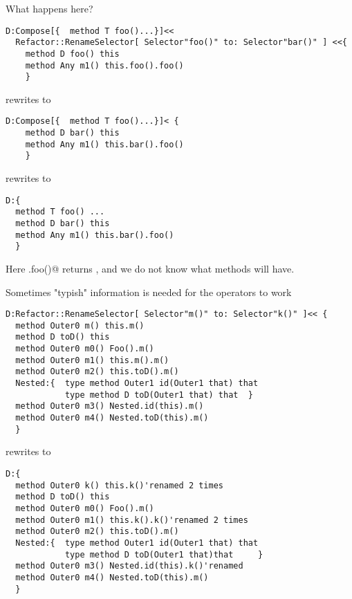 \begin{frame}[fragile]
What happens here?
\begin{NiceCode}{59ex}{0.8}
\begin{lstlisting}
D:Compose[{  method T foo()...}]<<
  Refactor::RenameSelector[ Selector"foo()" to: Selector"bar()" ] <<{
    method D foo() this
    method Any m1() this.foo().foo()
    }
\end{lstlisting}
\end{NiceCode}
rewrites to 
\begin{NiceCode}{59ex}{0.8}
\begin{lstlisting}
D:Compose[{  method T foo()...}]< {
    method D bar() this
    method Any m1() this.bar().foo()
    }
\end{lstlisting}
\end{NiceCode}
rewrites to 
\begin{NiceCode}{59ex}{0.8}
\begin{lstlisting}
D:{
  method T foo() ...
  method D bar() this
  method Any m1() this.bar().foo()
  }
\end{lstlisting}
\end{NiceCode}
Here \Q@this.foo()@ returns \Q@D@, and we do not know what methods
\Q@D@ will have.
\end{frame}



\begin{frame}[fragile]
Sometimes "typish" information is needed for the operators to work
\begin{NiceCode}{59ex}{0.8}
\begin{lstlisting}
D:Refactor::RenameSelector[ Selector"m()" to: Selector"k()" ]<< {
  method Outer0 m() this.m()
  method D toD() this
  method Outer0 m0() Foo().m()
  method Outer0 m1() this.m().m()
  method Outer0 m2() this.toD().m()
  Nested:{  type method Outer1 id(Outer1 that) that
            type method D toD(Outer1 that) that  }
  method Outer0 m3() Nested.id(this).m()
  method Outer0 m4() Nested.toD(this).m()
  }
\end{lstlisting}
\end{NiceCode}
rewrites to 

\begin{NiceCode}{59ex}{0.8}
\begin{lstlisting}
D:{
  method Outer0 k() this.k()'renamed 2 times
  method D toD() this
  method Outer0 m0() Foo().m()
  method Outer0 m1() this.k().k()'renamed 2 times
  method Outer0 m2() this.toD().m()
  Nested:{  type method Outer1 id(Outer1 that) that 
            type method D toD(Outer1 that)that     }
  method Outer0 m3() Nested.id(this).k()'renamed
  method Outer0 m4() Nested.toD(this).m()
  }
\end{lstlisting}
\end{NiceCode}
\end{frame}


